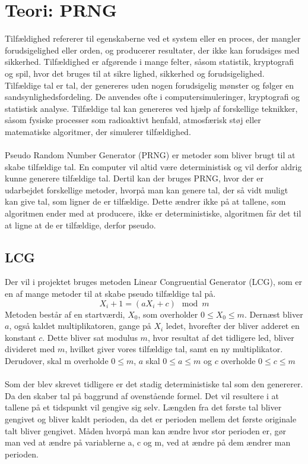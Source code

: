 \section{Teori: PRNG}
Tilfældighed refererer til egenskaberne ved et system eller en proces, der mangler forudsigelighed eller orden, og producerer resultater, der ikke kan forudsiges med sikkerhed. Tilfældighed er afgørende i mange felter, såsom statistik, kryptografi og spil, hvor det bruges til at sikre lighed, sikkerhed og forudsigelighed.
\\
Tilfældige tal er tal, der genereres uden nogen forudsigelig mønster og følger en sandsynlighedsfordeling. De anvendes ofte i computersimuleringer, kryptografi og statistisk analyse. Tilfældige tal kan genereres ved hjælp af forskellige teknikker, såsom fysiske processer som radioaktivt henfald, atmosfærisk støj eller matematiske algoritmer, der simulerer tilfældighed.
\\
\\
Pseudo Random Number Generator (PRNG) er metoder som bliver brugt til at skabe tilfældige tal. En computer vil altid være deterministisk og vil derfor aldrig kunne generere tilfældige tal. Dertil kan der bruges PRNG, hvor der er udarbejdet forskellige metoder, hvorpå man kan genere tal, der så vidt muligt kan give tal, som ligner de er tilfældige. Dette ændrer ikke på at tallene, som algoritmen ender med at producere, ikke er deterministiske, algoritmen får det til at ligne at de er tilfældige, derfor pseudo. 
\newpage
\subsection{LCG}
Der vil i projektet bruges metoden Linear Congruential Generator (LCG), som er en af mange metoder til at skabe pseudo tilfældige tal på. 
\\
\[X_i+1 = (aX_i+c)\mod m\]
Metoden består af en startværdi, $X_0$, som overholder $0 \le X_0 \le m$. Dernæst bliver $a$, også kaldet multiplikatoren, gange på $X_i$ ledet, hvorefter der bliver adderet en konstant $c$. Dette bliver sat modulus $m$, hvor resultat af det tidligere led, bliver divideret med $m$, hvilket giver vores tilfældige tal, samt en ny multiplikator. Derudover, skal m overholde $0 \le m$, $a$ skal $0 \le a \le m$ og $c$ overholde $0 \le c \le m$
\\
\\
Som der blev skrevet tidligere er det stadig deterministiske tal som den genererer. Da den skaber tal på baggrund af ovenstående formel. Det vil resultere i at tallene på et tidspunkt vil gengive sig selv. Længden fra det første tal bliver gengivet og bliver kaldt perioden, da det er perioden mellem det første originale talt bliver gengivet. Måden hvorpå man kan ændre hvor stor perioden er, gør man ved at ændre på variablerne a, c og m, ved at ændre på dem ændrer man perioden. 
